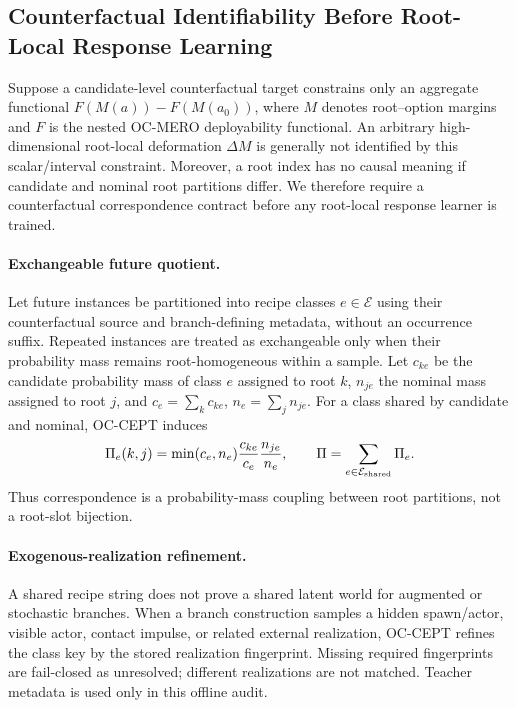 \documentclass[conference]{IEEEtran}
\begin{document}
\subsection{Counterfactual Identifiability Before Root-Local Response Learning}
\label{subsec:identifiability}
Suppose a candidate-level counterfactual target constrains only an aggregate functional $F(M(a))-F(M(a_0))$, where $M$ denotes root--option margins and $F$ is the nested OC-MERO deployability functional. An arbitrary high-dimensional root-local deformation $\Delta M$ is generally not identified by this scalar/interval constraint. Moreover, a root index has no causal meaning if candidate and nominal root partitions differ. We therefore require a counterfactual correspondence contract before any root-local response learner is trained.

\paragraph{Exchangeable future quotient.}
Let future instances be partitioned into recipe classes $e\in\mathcal{E}$ using their counterfactual source and branch-defining metadata, without an occurrence suffix. Repeated instances are treated as exchangeable only when their probability mass remains root-homogeneous within a sample. Let $c_{ke}$ be the candidate probability mass of class $e$ assigned to root $k$, $n_{je}$ the nominal mass assigned to root $j$, and $c_e=\sum_k c_{ke}$, $n_e=\sum_j n_{je}$. For a class shared by candidate and nominal, OC-CEPT induces
\begin{equation}
 \Pi_e(k,j)=\min(c_e,n_e)\frac{c_{ke}}{c_e}\frac{n_{je}}{n_e},
 \qquad \Pi=\sum_{e\in\mathcal{E}_{\rm shared}}\Pi_e.
 \label{eq:partition_transport}
\end{equation}
Thus correspondence is a probability-mass coupling between root partitions, not a root-slot bijection.

\paragraph{Exogenous-realization refinement.}
A shared recipe string does not prove a shared latent world for augmented or stochastic branches. When a branch construction samples a hidden spawn/actor, visible actor, contact impulse, or related external realization, OC-CEPT refines the class key by the stored realization fingerprint. Missing required fingerprints are fail-closed as unresolved; different realizations are not matched. Teacher metadata is used only in this offline audit.
\end{document}
